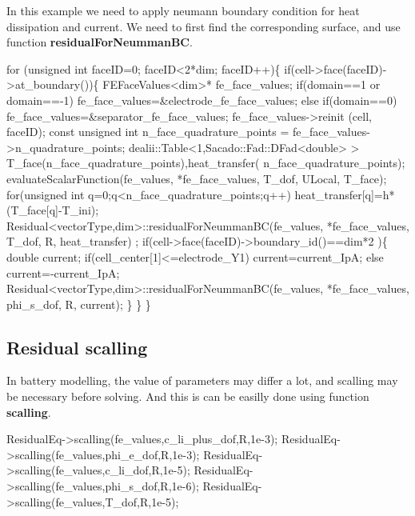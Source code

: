 In this example we need to apply neumann boundary condition for heat dissipation and current. We need to first find the corresponding surface, and use function {\bfseries residual\-For\-Neumman\-B\-C}. 
\begin{DoxyCode}
\textcolor{keywordflow}{for} (\textcolor{keywordtype}{unsigned} \textcolor{keywordtype}{int} faceID=0; faceID<2*dim; faceID++)\{
    \textcolor{keywordflow}{if}(cell->face(faceID)->at\_boundary())\{
        FEFaceValues<dim>* fe\_face\_values;
        \textcolor{keywordflow}{if}(domain==1 or domain==-1) fe\_face\_values=&electrode\_fe\_face\_values;
        \textcolor{keywordflow}{else} \textcolor{keywordflow}{if}(domain==0) fe\_face\_values=&separator\_fe\_face\_values;
        fe\_face\_values->reinit (cell, faceID);
        \textcolor{keyword}{const} \textcolor{keywordtype}{unsigned} \textcolor{keywordtype}{int} n\_face\_quadrature\_points = fe\_face\_values->n\_quadrature\_points;
        dealii::Table<1,Sacado::Fad::DFad<double> > T\_face(n\_face\_quadrature\_points),heat\_transfer(
      n\_face\_quadrature\_points);
        evaluateScalarFunction(fe\_values, *fe\_face\_values, T\_dof, ULocal, T\_face);
        \textcolor{keywordflow}{for}(\textcolor{keywordtype}{unsigned} \textcolor{keywordtype}{int} q=0;q<n\_face\_quadrature\_points;q++) heat\_transfer[q]=h*(T\_face[q]-T\_ini);
        Residual<vectorType,dim>::residualForNeummanBC(fe\_values, *fe\_face\_values, T\_dof, R, heat\_transfer)
      ;
        \textcolor{keywordflow}{if}(cell->face(faceID)->boundary\_id()==dim*2 )\{
            \textcolor{keywordtype}{double} current;
            \textcolor{keywordflow}{if}(cell\_center[1]<=electrode\_Y1) current=current\_IpA;
            \textcolor{keywordflow}{else} current=-current\_IpA;
            Residual<vectorType,dim>::residualForNeummanBC(fe\_values, *fe\_face\_values, phi\_s\_dof, R, 
      current);
        \}
    \}
\}   
\end{DoxyCode}
 \hypertarget{battery_electrode_scale_Scalling}{}\subsection{Residual scalling}\label{battery_electrode_scale_Scalling}
In battery modelling, the value of parameters may differ a lot, and scalling may be necessary before solving. And this is can be easilly done using function {\bfseries scalling}. 
\begin{DoxyCode}
ResidualEq->scalling(fe\_values,c\_li\_plus\_dof,R,1e-3);
ResidualEq->scalling(fe\_values,phi\_e\_dof,R,1e-3);
ResidualEq->scalling(fe\_values,c\_li\_dof,R,1e-5);
ResidualEq->scalling(fe\_values,phi\_s\_dof,R,1e-6);
ResidualEq->scalling(fe\_values,T\_dof,R,1e-5);
\end{DoxyCode}
